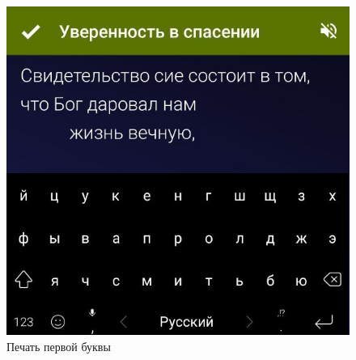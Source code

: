 \documentclass[t,aspectratio=169,14pt]{beamer}  %
\begin{document}
\begin{frame}[c]
\begin{multicols}{2}
\begin{center}
\begin{figure}
			\includegraphics[height=0.55\textheight]{remember-me-card-type}
			\caption{Печать первой буквы}
			\end{figure}		
		\end{center}
	 \end{multicols}
\end{frame}
\end{document}
